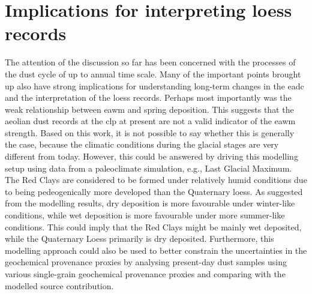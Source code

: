 
\section{Implications for interpreting loess records}
The attention of the discussion so far has been concerned with the processes of the dust cycle of up to annual time scale. Many of the important points brought up also have strong implications for understanding long-term changes in the \acrshort{eadc} and the interpretation of the loess records. 
Perhaps most importantly was the weak relationship between \acrshort{eawm} and spring deposition. This suggests that the aeolian dust records at the \acrshort{clp} at present are not a valid indicator of the \acrshort{eawm} strength. 
Based on this work, it is not possible to say whether this is generally the case, because the climatic conditions during the glacial stages are very different from today. However, this could be answered by driving this modelling setup using data from a paleoclimate simulation, e.g., Last Glacial Maximum.  
The Red Clays are considered to be formed under relatively humid conditions due to being pedeogenically more developed than the Quaternary loess. As suggested from the modelling results, dry deposition is more favourable under winter-like conditions, while wet deposition is more favourable under more summer-like conditions. This could imply that the Red Clays might be mainly wet deposited, while the Quaternary Loess primarily is dry deposited.
Furthermore, this modelling approach could also be used to better constrain the uncertainties in the geochemical provenance proxies by analysing present-day dust samples using various single-grain geochemical provenance proxies and comparing with the modelled source contribution. 


